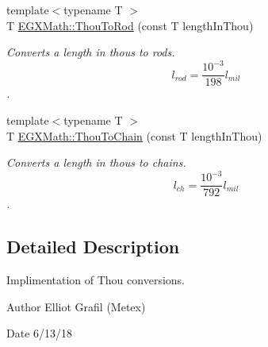 \begin{DoxyCompactItemize}
{\footnotesize template$<$typename T $>$ }\\T \mbox{\hyperlink{group___e_g_x_math-_conversions-_length_conversions-_imperial-_thou-_surveyors_ga904d9983041eecd1dbcc92d29e21d5f3}{E\+G\+X\+Math\+::\+Thou\+To\+Rod}} (const T length\+In\+Thou)
\begin{DoxyCompactList}\small\item\em Converts a length in thous to rods. \[ l_{rod}= \frac{10^{-3}}{198} l_{mil} \]. \end{DoxyCompactList}\item 
{\footnotesize template$<$typename T $>$ }\\T \mbox{\hyperlink{group___e_g_x_math-_conversions-_length_conversions-_imperial-_thou-_surveyors_gafe0134eff7a5cc259ee143f60a4aeec7}{E\+G\+X\+Math\+::\+Thou\+To\+Chain}} (const T length\+In\+Thou)
\begin{DoxyCompactList}\small\item\em Converts a length in thous to chains. \[ l_{ch}= \frac{10^{-3}}{792} l_{mil} \]. \end{DoxyCompactList}\end{DoxyCompactItemize}


\subsection{Detailed Description}
Implimentation of Thou conversions. 

\begin{DoxyAuthor}{Author}
Elliot Grafil (Metex) 
\end{DoxyAuthor}
\begin{DoxyDate}{Date}
6/13/18 
\end{DoxyDate}
